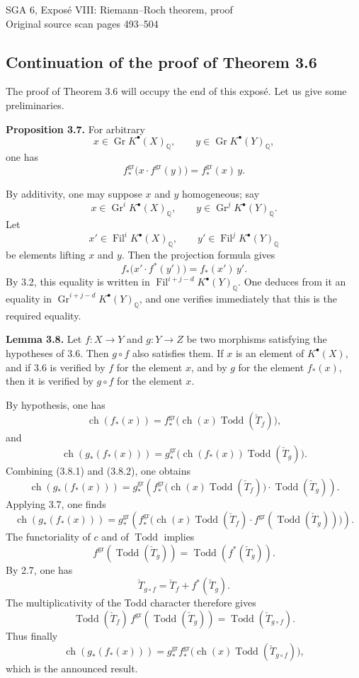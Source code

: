 \documentclass[11pt]{article}
\newcommand{\Gr}{\operatorname{Gr}}
\newcommand{\Fil}{\operatorname{Fil}}
\newcommand{\ch}{\operatorname{ch}}
\newcommand{\Todd}{\operatorname{Todd}}
\providecommand{\ch}{\operatorname{ch}}
\providecommand{\Todd}{\operatorname{Todd}}
\providecommand{\Gr}{\operatorname{Gr}}
\providecommand{\Gr}{\operatorname{G}}
\begin{document}
\begin{center}
{\Large SGA 6, Exposé VIII: Riemann--Roch theorem, proof}\\[0.4em]
{\large Original source scan pages 493--504}
\end{center}


\subsection*{Continuation of the proof of Theorem 3.6}

The proof of Theorem 3.6 will occupy the end of this exposé. Let us give some preliminaries.

\textbf{Proposition 3.7.} For arbitrary
\[
x\in \Gr K^{\bullet}(X)_{\mathbb Q},\qquad
y\in \Gr K^{\bullet}(Y)_{\mathbb Q},
\]
one has
\[
 f^{\mathrm{gr}}_*\bigl(x\cdot f^{\mathrm{gr}}(y)\bigr)
 =
 f^{\mathrm{gr}}_*(x)\,y .
\]

By additivity, one may suppose \(x\) and \(y\) homogeneous; say
\[
x\in \Gr^iK^{\bullet}(X)_{\mathbb Q},\qquad
y\in \Gr^jK^{\bullet}(Y)_{\mathbb Q}.
\]
Let
\[
x'\in \Fil^iK^{\bullet}(X)_{\mathbb Q},\qquad
y'\in \Fil^jK^{\bullet}(Y)_{\mathbb Q}
\]
be elements lifting \(x\) and \(y\). Then the projection formula gives
\[
 f_*\bigl(x'\cdot f^*(y')\bigr)=f_*(x')\,y'.
\]
By 3.2, this equality is written in
\(\Fil^{i+j-d}K^{\bullet}(Y)_{\mathbb Q}\). One deduces from it an equality in
\(\Gr^{i+j-d}K^{\bullet}(Y)_{\mathbb Q}\), and one verifies immediately that this is the required equality.

\textbf{Lemma 3.8.} Let \(f:X\to Y\) and \(g:Y\to Z\) be two morphisms satisfying the hypotheses of 3.6. Then \(g\circ f\) also satisfies them. If \(x\) is an element of \(K^{\bullet}(X)\), and if 3.6 is verified by \(f\) for the element \(x\), and by \(g\) for the element \(f_*(x)\), then it is verified by \(g\circ f\) for the element \(x\).

By hypothesis, one has
\begin{equation}\tag{3.8.1}
 \ch(f_*(x))=
 f^{\mathrm{gr}}_*\bigl(\ch(x)\Todd(\check T_f)\bigr),
\end{equation}
and
\begin{equation}\tag{3.8.2}
 \ch(g_*(f_*(x)))=
 g^{\mathrm{gr}}_*\bigl(\ch(f_*(x))\Todd(\check T_g)\bigr).
\end{equation}
Combining (3.8.1) and (3.8.2), one obtains
\[
\ch(g_*(f_*(x)))=
g^{\mathrm{gr}}_*\!\left(
 f^{\mathrm{gr}}_*\bigl(\ch(x)\Todd(\check T_f)\bigr)\cdot \Todd(\check T_g)
\right).
\]
Applying 3.7, one finds
\[
\ch(g_*(f_*(x)))=
g^{\mathrm{gr}}_*\!\left(
 f^{\mathrm{gr}}_*\bigl(\ch(x)\Todd(\check T_f)\cdot
 f^{\mathrm{gr}}(\Todd(\check T_g))\bigr)
\right).
\]
The functoriality of \(c\) and of \(\Todd\) implies
\[
 f^{\mathrm{gr}}(\Todd(\check T_g))=\Todd(f^*(\check T_g)).
\]
By 2.7, one has
\[
 \check T_{g\circ f}=\check T_f+f^*(\check T_g).
\]
The multiplicativity of the Todd character therefore gives
\[
 \Todd(\check T_f)\,f^{\mathrm{gr}}(\Todd(\check T_g))
 =
 \Todd(\check T_{g\circ f}).
\]
Thus finally
\[
 \ch(g_*(f_*(x)))=
 g^{\mathrm{gr}}_* f^{\mathrm{gr}}_*\bigl(\ch(x)\Todd(\check T_{g\circ f})\bigr),
\]
which is the announced result.
\end{document}
